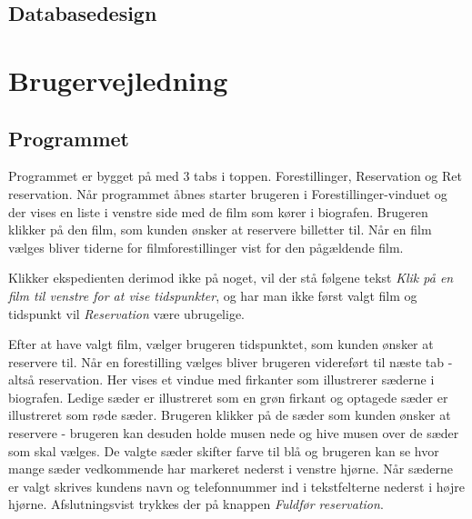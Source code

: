 \documentclass[final]{rapport1}
\begin{document}
\section{Databasedesign}






\chapter{Brugervejledning}
\section{Programmet}
Programmet er bygget på med 3 tabs i toppen. Forestillinger, Reservation og Ret reservation. Når programmet åbnes starter brugeren i Forestillinger-vinduet og der vises en liste i venstre side med de film som kører i biografen. Brugeren klikker på den film, som kunden ønsker at reservere billetter til. Når en film vælges bliver tiderne for filmforestillinger vist for den pågældende film. 

Klikker ekspedienten derimod ikke på noget, vil der stå følgene tekst \emph{Klik på en film til venstre for at vise tidspunkter}, og har man ikke først valgt film og tidspunkt vil \emph{Reservation} være ubrugelige.

Efter at have valgt film, vælger brugeren tidspunktet, som kunden ønsker at reservere til. Når en forestilling vælges bliver brugeren videreført til næste tab - altså reservation. Her vises et vindue med firkanter som illustrerer sæderne i biografen. Ledige sæder er illustreret som en grøn firkant og optagede sæder er illustreret som røde sæder. Brugeren klikker på de sæder som kunden ønsker at reservere - brugeren kan desuden holde musen nede og hive musen over de sæder som skal vælges. De valgte sæder skifter farve til blå og brugeren kan se hvor mange sæder vedkommende har markeret nederst i venstre hjørne. Når sæderne er valgt skrives kundens navn og telefonnummer ind i tekstfelterne nederst i højre hjørne. Afslutningsvist trykkes der på knappen \emph{Fuldfør reservation}. 
\end{document}
